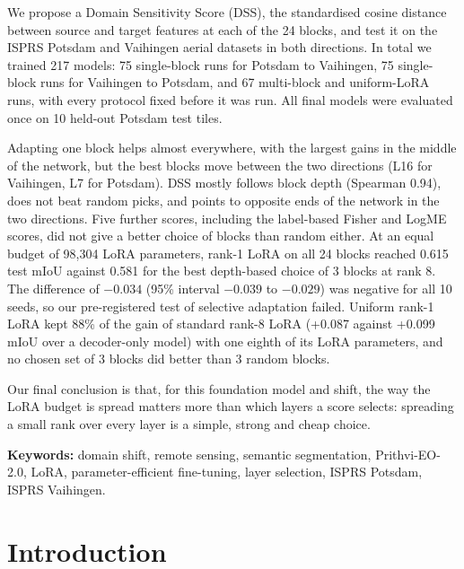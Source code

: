 \documentclass[11pt,a4paper]{report}
\newif\ifblankpage
\newcommand{\blankpage}{%
  \clearpage\blankpagetrue\thispagestyle{empty}\null\clearpage
  \blankpagefalse\addtocounter{page}{-1}}
\begin{document}
We propose a Domain Sensitivity Score (DSS), the standardised cosine distance between source and target features at each of the 24 blocks, and test it on the ISPRS Potsdam and Vaihingen aerial datasets in both directions. In total we trained 217 models: 75 single-block runs for Potsdam to Vaihingen, 75 single-block runs for Vaihingen to Potsdam, and 67 multi-block and uniform-LoRA runs, with every protocol fixed before it was run. All final models were evaluated once on 10 held-out Potsdam test tiles.

Adapting one block helps almost everywhere, with the largest gains in the middle of the network, but the best blocks move between the two directions (L16 for Vaihingen, L7 for Potsdam). DSS mostly follows block depth (Spearman 0.94), does not beat random picks, and points to opposite ends of the network in the two directions. Five further scores, including the label-based Fisher and LogME scores, did not give a better choice of blocks than random either. At an equal budget of 98,304 LoRA parameters, rank-1 LoRA on all 24 blocks reached 0.615 test mIoU against 0.581 for the best depth-based choice of 3 blocks at rank 8. The difference of $-0.034$ (95\% interval $-0.039$ to $-0.029$) was negative for all 10 seeds, so our pre-registered test of selective adaptation failed. Uniform rank-1 LoRA kept 88\% of the gain of standard rank-8 LoRA (+0.087 against +0.099 mIoU over a decoder-only model) with one eighth of its LoRA parameters, and no chosen set of 3 blocks did better than 3 random blocks.

Our final conclusion is that, for this foundation model and shift, the way the LoRA budget is spread matters more than which layers a score selects: spreading a small rank over every layer is a simple, strong and cheap choice.

\textbf{Keywords:} domain shift, remote sensing, semantic segmentation, Prithvi-EO-2.0, LoRA, parameter-efficient fine-tuning, layer selection, ISPRS Potsdam, ISPRS Vaihingen.

\blankpage

\tableofcontents
\newpage
\listoffigures
\listoftables
\blankpage

\twocolumn
{}

\chapter{Introduction}
\end{document}
